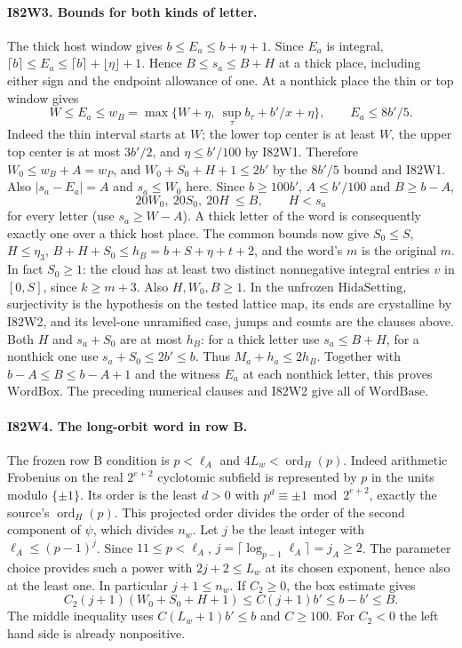\paragraph{I82W3. Bounds for both kinds of letter.}
The thick host window gives $b\le E_a\le b+\eta+1$.
Since $E_a$ is integral,
$\lceil b\rceil\le E_a\le\lceil b\rceil+\lfloor\eta\rfloor+1$.
Hence $B\le s_a\le B+H$ at a thick place, including either sign
and the endpoint allowance of one. At a nonthick place the thin
or top window gives
\[
 W\le E_a\le w_B=
 \max\{W+\eta,\ \sup_\tau b_\tau+b'/x+\eta\},
 \qquad E_a\le 8b'/5.
\]
Indeed the thin interval starts at $W$; the lower top center is
at least $W$, the upper top center is at most $3b'/2$, and
$\eta\le b'/100$ by I82W1. Therefore $W_0\le w_B+A=w_P$,
and $W_0+S_0+H+1\le2b'$ by the $8b'/5$ bound and I82W1.
Also $\lvert s_a-E_a\rvert=A$ and $s_a\le W_0$ here.
Since $b\ge100b'$, $A\le b'/100$ and $B\ge b-A$,
\[
 20W_0,\ 20S_0,\ 20H\ \le B,\qquad H<s_a
\]
for every letter (use $s_a\ge W-A$). A thick letter of the word
is consequently exactly one over a thick host place.
The common bounds now give $S_0\le S$, $H\le\eta_3$,
$B+H+S_0\le h_B=b+S+\eta+t+2$, and the word's $m$ is
the original $m$. In fact $S_0\ge1$: the cloud has at least two
distinct nonnegative integral entries $v$ in $[0,S]$, since
$k\ge m+3$. Also $H,W_0,B\ge1$. In the unfrozen
$\mathrm{HidaSetting}$, surjectivity is the hypothesis on the
tested lattice map, its ends are crystalline by I82W2, and its
level-one unramified case, jumps and counts are the clauses above.
Both $H$ and $s_a+S_0$ are at most $h_B$:
for a thick letter use $s_a\le B+H$, for a nonthick one use
$s_a+S_0\le2b'\le b$. Thus $M_a+h_a\le 2h_B$. Together with
$b-A\le B\le b-A+1$ and the witness $E_a$ at each nonthick
letter, this proves $\mathrm{WordBox}$. The preceding numerical
clauses and I82W2 give all of $\mathrm{WordBase}$.

\paragraph{I82W4. The long-orbit word in row B.}
The frozen row B condition is $p<\ell_A$ and
$4L_w<\operatorname{ord}_H(p)$. Indeed arithmetic Frobenius
on the real $2^{e+2}$ cyclotomic subfield is represented by $p$
in the units modulo $\{\pm1\}$. Its order is the least $d>0$
with $p^d\equiv\pm1\bmod 2^{e+2}$, exactly the source's
$\operatorname{ord}_H(p)$. This projected order divides the
order of the second component of $\psi$, which divides $n_w$.
Let $j$ be the least integer with $\ell_A\le(p-1)^j$.
Since $11\le p<\ell_A$, $j=\lceil\log_{p-1}\ell_A\rceil
=j_A\ge2$. The parameter choice provides such a power with
$2j+2\le L_w$ at its chosen exponent, hence also at the least one.
In particular $j+1\le n_w$. If $C_2\ge0$, the box estimate gives
\[
 C_2(j+1)(W_0+S_0+H+1)\le C(j+1)b'\le b-b'\le B .
\]
The middle inequality uses $C(L_w+1)b'\le b$ and $C\ge100$.
For $C_2<0$ the left hand side is already nonpositive.

